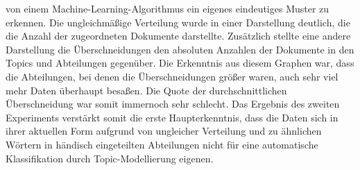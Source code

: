\documentclass[german,version-2020-11]{uzl-thesis}
\begin{document}
von einem Machine-Learning-Algorithmus ein eigenes eindeutiges Muster zu erkennen. Die ungleichmäßige Verteilung wurde in einer Darstellung deutlich, die die Anzahl der zugeordneten Dokumente darstellte. Zusätzlich stellte eine andere Darstellung die Überschneidungen den absoluten Anzahlen der Dokumente in den Topics und Abteilungen gegenüber. Die Erkenntnis aus diesem Graphen war, dass die Abteilungen, bei denen die Überschneidungen größer waren, auch sehr viel mehr Daten überhaupt besaßen. Die Quote der durchschnittlichen Überschneidung war somit immernoch sehr schlecht. Das Ergebnis des zweiten Experiments verstärkt somit die erste Haupterkenntnis, dass die Daten sich in ihrer aktuellen Form aufgrund von ungleicher Verteilung und zu ähnlichen Wörtern in händisch eingeteilten Abteilungen nicht für eine automatische Klassifikation durch Topic-Modellierung eigenen.

%






%
\end{document}
